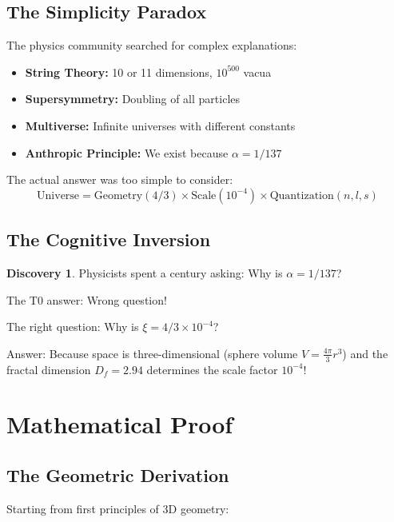\documentclass[12pt,a4paper]{article}
\theoremstyle{definition}
\newtheorem{discovery}{Discovery}[section]
\begin{document}
	\subsection{The Simplicity Paradox}
	
	The physics community searched for complex explanations:
	
	\begin{itemize}
		\item \textbf{String Theory:} 10 or 11 dimensions, $10^{500}$ vacua
		\item \textbf{Supersymmetry:} Doubling of all particles
		\item \textbf{Multiverse:} Infinite universes with different constants
		\item \textbf{Anthropic Principle:} We exist because $\alpha = 1/137$
	\end{itemize}
	
	The actual answer was too simple to consider:
	\begin{equation}
		\boxed{\text{Universe} = \text{Geometry}(4/3) \times \text{Scale}(10^{-4}) \times \text{Quantization}(n,l,s)}
	\end{equation}
	
	\subsection{The Cognitive Inversion}
	
	\begin{discovery}
		Physicists spent a century asking: Why is $\alpha = 1/137$?
		
		The T0 answer: Wrong question!
		
		The right question: Why is $\xi = 4/3 \times 10^{-4}$?
		
Answer: Because space is three-dimensional (sphere volume $V = \frac{4\pi}{3}r^3$) and the fractal dimension $D_f = 2.94$ determines the scale factor $10^{-4}$!
	\end{discovery}
	
	\section{Mathematical Proof}
	
	\subsection{The Geometric Derivation}
	
	Starting from first principles of 3D geometry:
	
\end{document}
